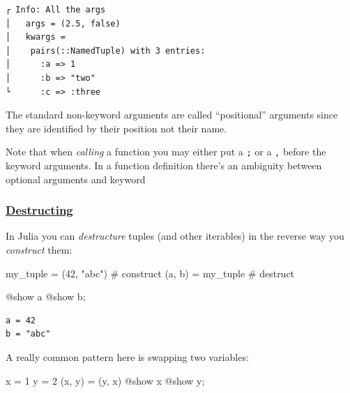 \documentclass[
]{article}
\newenvironment{Shaded}{\begin{snugshade}}{\end{snugshade}}
\newcommand{\CommentTok}[1]{\textcolor[rgb]{0.37,0.37,0.37}{#1}}
\newcommand{\FloatTok}[1]{\textcolor[rgb]{0.68,0.00,0.00}{#1}}
\newcommand{\NormalTok}[1]{\textcolor[rgb]{0.00,0.23,0.31}{#1}}
\newcommand{\OperatorTok}[1]{\textcolor[rgb]{0.37,0.37,0.37}{#1}}
\newcommand{\PreprocessorTok}[1]{\textcolor[rgb]{0.68,0.00,0.00}{#1}}
\newcommand{\StringTok}[1]{\textcolor[rgb]{0.13,0.47,0.30}{#1}}
\begin{document}
\begin{verbatim}
┌ Info: All the args
│   args = (2.5, false)
│   kwargs =
│    pairs(::NamedTuple) with 3 entries:
│      :a => 1
│      :b => "two"
└      :c => :three
\end{verbatim}

The standard non-keyword arguments are called ``positional'' arguments
since they are identified by their position not their name.

Note that when \emph{calling} a function you may either put a \texttt{;}
or a \texttt{,} before the keyword arguments. In a function definition
there's an ambiguity between optional arguments and keyword

\subsubsection{\texorpdfstring{\href{https://docs.julialang.org/en/v1/manual/functions/\#Argument-destructuring}{Destructing}}{Destructing}}\label{destructing}

In Julia you can \emph{destructure} tuples (and other iterables) in the
reverse way you \emph{construct} them:

\begin{Shaded}
\begin{Highlighting}[]
\NormalTok{my\_tuple }\OperatorTok{=}\NormalTok{ (}\FloatTok{42}\NormalTok{, }\StringTok{"abc"}\NormalTok{)  }\CommentTok{\# construct}
\NormalTok{(a, b) }\OperatorTok{=}\NormalTok{ my\_tuple       }\CommentTok{\# destruct}

\PreprocessorTok{@show}\NormalTok{ a}
\PreprocessorTok{@show}\NormalTok{ b;}
\end{Highlighting}
\end{Shaded}

\begin{verbatim}
a = 42
b = "abc"
\end{verbatim}

A really common pattern here is swapping two variables:

\begin{Shaded}
\begin{Highlighting}[]
\NormalTok{x }\OperatorTok{=} \FloatTok{1}
\NormalTok{y }\OperatorTok{=} \FloatTok{2}
\NormalTok{(x, y) }\OperatorTok{=}\NormalTok{ (y, x)}
\PreprocessorTok{@show}\NormalTok{ x}
\PreprocessorTok{@show}\NormalTok{ y;}
\end{Highlighting}
\end{Shaded}
\end{document}
